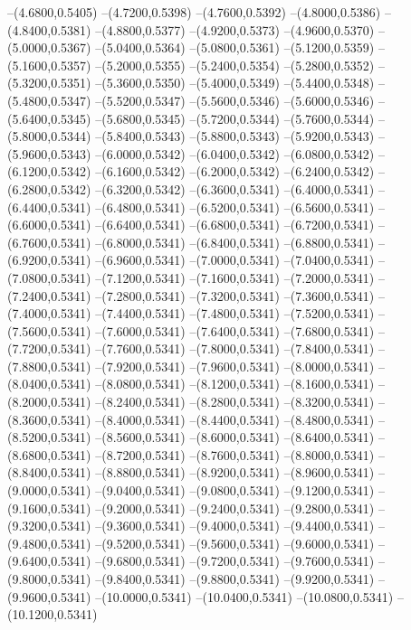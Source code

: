 {	--(4.6800,0.5405)
	--(4.7200,0.5398)
	--(4.7600,0.5392)
	--(4.8000,0.5386)
	--(4.8400,0.5381)
	--(4.8800,0.5377)
	--(4.9200,0.5373)
	--(4.9600,0.5370)
	--(5.0000,0.5367)
	--(5.0400,0.5364)
	--(5.0800,0.5361)
	--(5.1200,0.5359)
	--(5.1600,0.5357)
	--(5.2000,0.5355)
	--(5.2400,0.5354)
	--(5.2800,0.5352)
	--(5.3200,0.5351)
	--(5.3600,0.5350)
	--(5.4000,0.5349)
	--(5.4400,0.5348)
	--(5.4800,0.5347)
	--(5.5200,0.5347)
	--(5.5600,0.5346)
	--(5.6000,0.5346)
	--(5.6400,0.5345)
	--(5.6800,0.5345)
	--(5.7200,0.5344)
	--(5.7600,0.5344)
	--(5.8000,0.5344)
	--(5.8400,0.5343)
	--(5.8800,0.5343)
	--(5.9200,0.5343)
	--(5.9600,0.5343)
	--(6.0000,0.5342)
	--(6.0400,0.5342)
	--(6.0800,0.5342)
	--(6.1200,0.5342)
	--(6.1600,0.5342)
	--(6.2000,0.5342)
	--(6.2400,0.5342)
	--(6.2800,0.5342)
	--(6.3200,0.5342)
	--(6.3600,0.5341)
	--(6.4000,0.5341)
	--(6.4400,0.5341)
	--(6.4800,0.5341)
	--(6.5200,0.5341)
	--(6.5600,0.5341)
	--(6.6000,0.5341)
	--(6.6400,0.5341)
	--(6.6800,0.5341)
	--(6.7200,0.5341)
	--(6.7600,0.5341)
	--(6.8000,0.5341)
	--(6.8400,0.5341)
	--(6.8800,0.5341)
	--(6.9200,0.5341)
	--(6.9600,0.5341)
	--(7.0000,0.5341)
	--(7.0400,0.5341)
	--(7.0800,0.5341)
	--(7.1200,0.5341)
	--(7.1600,0.5341)
	--(7.2000,0.5341)
	--(7.2400,0.5341)
	--(7.2800,0.5341)
	--(7.3200,0.5341)
	--(7.3600,0.5341)
	--(7.4000,0.5341)
	--(7.4400,0.5341)
	--(7.4800,0.5341)
	--(7.5200,0.5341)
	--(7.5600,0.5341)
	--(7.6000,0.5341)
	--(7.6400,0.5341)
	--(7.6800,0.5341)
	--(7.7200,0.5341)
	--(7.7600,0.5341)
	--(7.8000,0.5341)
	--(7.8400,0.5341)
	--(7.8800,0.5341)
	--(7.9200,0.5341)
	--(7.9600,0.5341)
	--(8.0000,0.5341)
	--(8.0400,0.5341)
	--(8.0800,0.5341)
	--(8.1200,0.5341)
	--(8.1600,0.5341)
	--(8.2000,0.5341)
	--(8.2400,0.5341)
	--(8.2800,0.5341)
	--(8.3200,0.5341)
	--(8.3600,0.5341)
	--(8.4000,0.5341)
	--(8.4400,0.5341)
	--(8.4800,0.5341)
	--(8.5200,0.5341)
	--(8.5600,0.5341)
	--(8.6000,0.5341)
	--(8.6400,0.5341)
	--(8.6800,0.5341)
	--(8.7200,0.5341)
	--(8.7600,0.5341)
	--(8.8000,0.5341)
	--(8.8400,0.5341)
	--(8.8800,0.5341)
	--(8.9200,0.5341)
	--(8.9600,0.5341)
	--(9.0000,0.5341)
	--(9.0400,0.5341)
	--(9.0800,0.5341)
	--(9.1200,0.5341)
	--(9.1600,0.5341)
	--(9.2000,0.5341)
	--(9.2400,0.5341)
	--(9.2800,0.5341)
	--(9.3200,0.5341)
	--(9.3600,0.5341)
	--(9.4000,0.5341)
	--(9.4400,0.5341)
	--(9.4800,0.5341)
	--(9.5200,0.5341)
	--(9.5600,0.5341)
	--(9.6000,0.5341)
	--(9.6400,0.5341)
	--(9.6800,0.5341)
	--(9.7200,0.5341)
	--(9.7600,0.5341)
	--(9.8000,0.5341)
	--(9.8400,0.5341)
	--(9.8800,0.5341)
	--(9.9200,0.5341)
	--(9.9600,0.5341)
	--(10.0000,0.5341)
	--(10.0400,0.5341)
	--(10.0800,0.5341)
	--(10.1200,0.5341)
}
